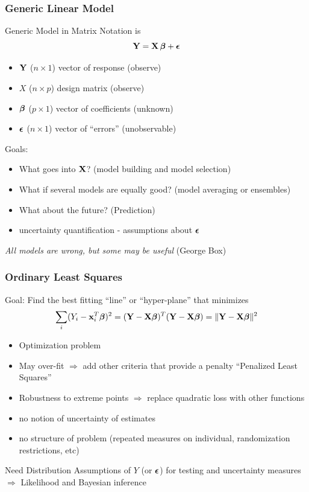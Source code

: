 \documentclass[handout]{beamer}\usepackage[]{graphicx}\usepackage[]{color}
\begin{document}
\begin{frame}
  \frametitle{Generic Linear  Model}
  Generic Model in Matrix Notation is
$$
\mathbf{Y}  = \mathbf{X} \, \boldsymbol{\beta} + \boldsymbol{\epsilon}  $$
\pause
\begin{itemize}
\item $\mathbf{Y}$ ($n \times 1$) vector of response   (observe)
\item $X$ ($n \times p$)  design matrix  (observe)
\item $\boldsymbol{\beta}$ ($p \times 1$) vector of coefficients  (unknown)
\item $\boldsymbol{\epsilon}$ ($n \times 1$) vector of ``errors''  (unobservable)
\end{itemize} \pause

Goals: \pause
\begin{itemize}
\item What goes into $\mathbf{X}$?   (model building and model selection) \pause
\item What if several models are equally good?  (model averaging or ensembles) \pause
\item What about the future?  (Prediction) \pause
\item uncertainty quantification - assumptions about $\boldsymbol{\epsilon}$\pause
\end{itemize}
{\it All models are wrong, but some may be useful }  (George Box)
\end{frame}

\begin{frame}
  \frametitle{Ordinary Least Squares}
  Goal: Find the best fitting ``line'' or ``hyper-plane'' that
  minimizes
$$\sum_i  (Y_i - \mathbf{x}_i^T \boldsymbol{\beta})^2 = (\mathbf{Y} - \mathbf{X}\boldsymbol{\beta})^T(\mathbf{Y} - \mathbf{X} \boldsymbol{\beta}) = \| \mathbf{Y} -
\mathbf{X}\boldsymbol{\beta} \|^2 $$  \pause

\begin{itemize}
\item Optimization problem \pause
\item May over-fit $\Rightarrow$ add other criteria that provide a penalty
  ``Penalized Least Squares'' \pause
\item Robustness to extreme points $\Rightarrow$ replace quadratic
  loss with other functions  \pause
\item no notion of uncertainty of estimates  \pause
\item no structure of problem  (repeated measures on individual,
  randomization restrictions, etc) \pause
\end{itemize}
Need  Distribution Assumptions of $Y$ (or $\boldsymbol{\epsilon}$) for testing and
uncertainty measures \pause $\Rightarrow$ Likelihood  and Bayesian inference
\end{frame}
\end{document}
